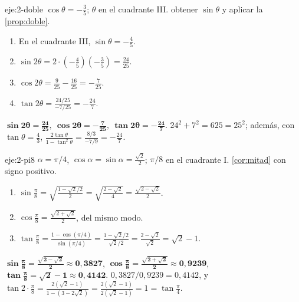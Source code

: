 \begin{solucion}{eje:2-doble}
\datos $\cos\theta=-\frac35$; $\theta$ en el cuadrante III.
\planteamiento obtener $\sin\theta$ y aplicar la \cref{prop:doble}.
\pasos
\begin{enumerate}[label=\arabic*.]
  \item En el cuadrante III, $\sin\theta=-\frac45$.
  \item $\sin2\theta=2\cdot(-\frac45)(-\frac35)=\frac{24}{25}$.
  \item $\cos2\theta=\frac{9}{25}-\frac{16}{25}=-\frac{7}{25}$.
  \item $\tan2\theta=\frac{24/25}{-7/25}=-\frac{24}{7}$.
\end{enumerate}
\resultado $\mathbf{\sin2\theta=\frac{24}{25},\ \cos2\theta=-\frac{7}{25},\ \tan2\theta=-\frac{24}{7}}$.
\comprobacion $24^{2}+7^{2}=625=25^{2}$; además, con $\tan\theta=\frac43$, $\frac{2\tan\theta}{1-\tan^{2}\theta}=\frac{8/3}{-7/9}=-\frac{24}{7}$.
\end{solucion}

\begin{solucion}{eje:2-pi8}
\datos $\alpha=\pi/4$, $\cos\alpha=\sin\alpha=\frac{\sqrt2}{2}$; $\pi/8$ en el cuadrante I.
\planteamiento \cref{cor:mitad} con signo positivo.
\pasos
\begin{enumerate}[label=\arabic*.]
  \item $\sin\frac{\pi}{8}=\sqrt{\frac{1-\sqrt2/2}{2}}=\sqrt{\frac{2-\sqrt2}{4}}=\frac{\sqrt{2-\sqrt2}}{2}$.
  \item $\cos\frac{\pi}{8}=\frac{\sqrt{2+\sqrt2}}{2}$, del mismo modo.
  \item $\tan\frac{\pi}{8}=\frac{1-\cos(\pi/4)}{\sin(\pi/4)}=\frac{1-\sqrt2/2}{\sqrt2/2}=\frac{2-\sqrt2}{\sqrt2}=\sqrt2-1$.
\end{enumerate}
\resultado $\mathbf{\sin\frac{\pi}{8}=\frac{\sqrt{2-\sqrt2}}{2}\approx0{,}3827}$, $\mathbf{\cos\frac{\pi}{8}=\frac{\sqrt{2+\sqrt2}}{2}\approx0{,}9239}$, $\mathbf{\tan\frac{\pi}{8}=\sqrt2-1\approx0{,}4142}$.
\comprobacion $0{,}3827/0{,}9239=0{,}4142$, y $\tan2\cdot\frac{\pi}{8}=\frac{2(\sqrt2-1)}{1-(3-2\sqrt2)}=\frac{2(\sqrt2-1)}{2(\sqrt2-1)}=1=\tan\frac{\pi}{4}$.
\end{solucion}

